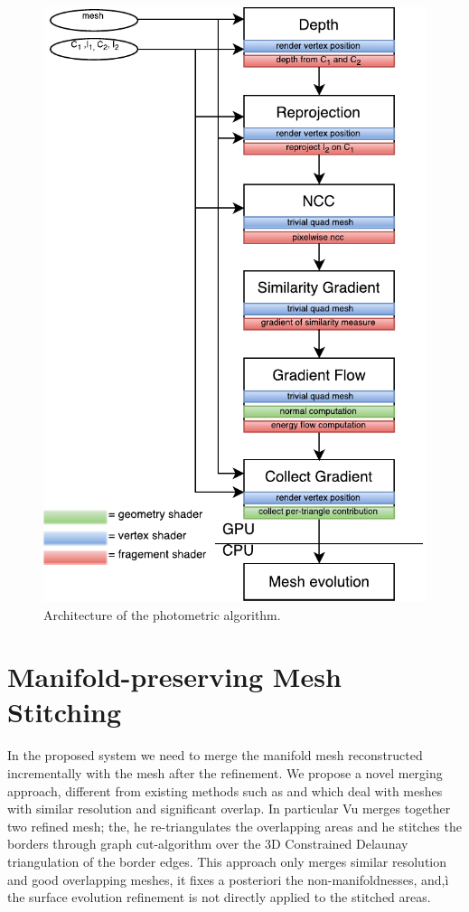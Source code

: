 \begin{figure}[tp]
\centering
\includegraphics[height=0.92\textheight]{./img/ch-incr-dens/incr-shaders-architecture}
\caption{Architecture of the photometric algorithm.}
\label{fig:openglIncrRef}
\end{figure}



\section{Manifold-preserving Mesh Stitching}
\label{sec:Mesh_merging}
In the proposed system we need to merge the manifold mesh reconstructed incrementally with the mesh after the refinement.
We propose a novel merging approach, different from existing methods such as \cite{turk1994zippered} and \cite{VuPhD011} which deal with meshes with similar resolution and significant overlap. 
In particular  Vu  \cite{VuPhD011} merges together two  refined mesh; the,  he re-triangulates the overlapping areas and he stitches the borders through graph cut-algorithm over the 3D Constrained Delaunay triangulation of the border edges.
This approach only merges similar resolution and good overlapping meshes, it fixes a posteriori the non-manifoldnesses, and,ì the surface evolution refinement is not directly applied to the stitched areas.


